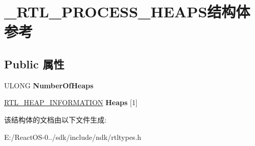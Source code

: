 \hypertarget{struct___r_t_l___p_r_o_c_e_s_s___h_e_a_p_s}{}\section{\+\_\+\+R\+T\+L\+\_\+\+P\+R\+O\+C\+E\+S\+S\+\_\+\+H\+E\+A\+P\+S结构体 参考}
\label{struct___r_t_l___p_r_o_c_e_s_s___h_e_a_p_s}
\subsection*{Public 属性}
\begin{DoxyCompactItemize}
\item 
\mbox{\label{struct___r_t_l___p_r_o_c_e_s_s___h_e_a_p_s_a5b592e307a56191767404c920787f985}} 
U\+L\+O\+NG {\bfseries Number\+Of\+Heaps}
\item 
\mbox{\label{struct___r_t_l___p_r_o_c_e_s_s___h_e_a_p_s_ac50a295dba06ce435b6862d5b374831b}} 
\hyperlink{struct___r_t_l___h_e_a_p___i_n_f_o_r_m_a_t_i_o_n}{R\+T\+L\+\_\+\+H\+E\+A\+P\+\_\+\+I\+N\+F\+O\+R\+M\+A\+T\+I\+ON} {\bfseries Heaps} \mbox{[}1\mbox{]}
\end{DoxyCompactItemize}


该结构体的文档由以下文件生成\+:\begin{DoxyCompactItemize}
\item 
E\+:/\+React\+O\+S-\/0../sdk/include/ndk/rtltypes.\+h\end{DoxyCompactItemize}
